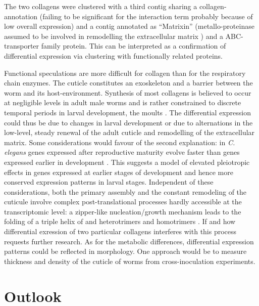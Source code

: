 The two collagens were clustered with a third contig sharing a
collagen-annotation (failing to be significant for the interaction
term probably because of low overall expression) and a contig
annotated as ``Matrixin'' (metallo-proteinase assumed to be involved
in remodelling the extracellular matrix \cite{mealloprot}) and a
ABC-transporter family protein. This can be interpreted as a
confirmation of differential expression via clustering with
functionally related proteins.

Functional speculations are more difficult for collagen than for the
respiratory chain enzymes. The cuticle constitutes an exoskeleton and
a barrier between the worm and its host-environment. Synthesis of most
collagens is believed to occur at negligible levels in adult male
worms and is rather constrained to discrete temporal periods in larval
development, the moults \cite{pmid10637627}. The differential
expression could thus be due to changes in larval development or due
to alternations in the low-level, steady renewal of the adult cuticle
and remodelling of the extracellular matrix. Some considerations would
favour of the second explanation: in \textit{C. elegans} genes
expressed after reproductive maturity evolve faster than genes
expressed earlier in development \cite{pmid15371532}. This suggests a
model of elevated pleiotropic effects in genes expressed at earlier
stages of development and hence more conserved expression patterns in
larval stages. Independent of these considerations, both the primary
assembly and the constant remodeling of the cuticule involve complex
post-translational processes hardly accessible at the transcriptomic
level: a zipper-like nucleation/growth mechanism leads to the folding
of a triple helix of and heterotrimers and homotrimers
\cite{kennedy2001parasitic}. If and how differential exression of two
particular collagens interferes with this process requests further
research. As for the metabolic differences, differential expression
patterns could be reflected in morphology. One approach would be to
measure thickness and density of the cuticle of worms from
cross-inoculation experiments.

\section{Outlook}

